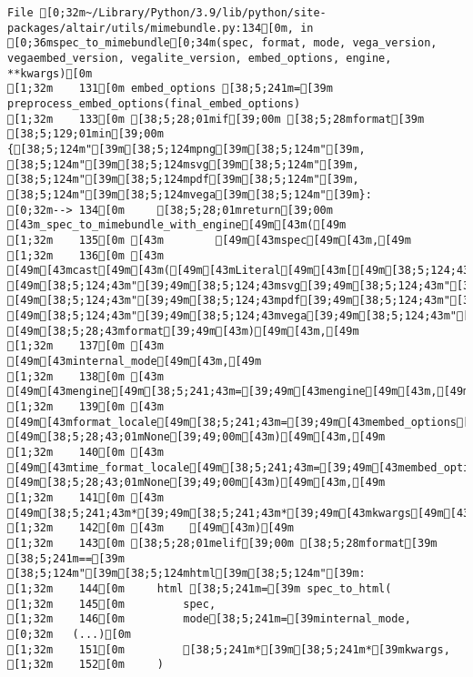 \documentclass[
  letterpaper,
  DIV=11,
  numbers=noendperiod]{scrartcl}
\begin{document}
\begin{verbatim}
File [0;32m~/Library/Python/3.9/lib/python/site-packages/altair/utils/mimebundle.py:134[0m, in [0;36mspec_to_mimebundle[0;34m(spec, format, mode, vega_version, vegaembed_version, vegalite_version, embed_options, engine, **kwargs)[0m
[1;32m    131[0m embed_options [38;5;241m=[39m preprocess_embed_options(final_embed_options)
[1;32m    133[0m [38;5;28;01mif[39;00m [38;5;28mformat[39m [38;5;129;01min[39;00m {[38;5;124m"[39m[38;5;124mpng[39m[38;5;124m"[39m, [38;5;124m"[39m[38;5;124msvg[39m[38;5;124m"[39m, [38;5;124m"[39m[38;5;124mpdf[39m[38;5;124m"[39m, [38;5;124m"[39m[38;5;124mvega[39m[38;5;124m"[39m}:
[0;32m--> 134[0m     [38;5;28;01mreturn[39;00m [43m_spec_to_mimebundle_with_engine[49m[43m([49m
[1;32m    135[0m [43m        [49m[43mspec[49m[43m,[49m
[1;32m    136[0m [43m        [49m[43mcast[49m[43m([49m[43mLiteral[49m[43m[[49m[38;5;124;43m"[39;49m[38;5;124;43mpng[39;49m[38;5;124;43m"[39;49m[43m,[49m[43m [49m[38;5;124;43m"[39;49m[38;5;124;43msvg[39;49m[38;5;124;43m"[39;49m[43m,[49m[43m [49m[38;5;124;43m"[39;49m[38;5;124;43mpdf[39;49m[38;5;124;43m"[39;49m[43m,[49m[43m [49m[38;5;124;43m"[39;49m[38;5;124;43mvega[39;49m[38;5;124;43m"[39;49m[43m][49m[43m,[49m[43m [49m[38;5;28;43mformat[39;49m[43m)[49m[43m,[49m
[1;32m    137[0m [43m        [49m[43minternal_mode[49m[43m,[49m
[1;32m    138[0m [43m        [49m[43mengine[49m[38;5;241;43m=[39;49m[43mengine[49m[43m,[49m
[1;32m    139[0m [43m        [49m[43mformat_locale[49m[38;5;241;43m=[39;49m[43membed_options[49m[38;5;241;43m.[39;49m[43mget[49m[43m([49m[38;5;124;43m"[39;49m[38;5;124;43mformatLocale[39;49m[38;5;124;43m"[39;49m[43m,[49m[43m [49m[38;5;28;43;01mNone[39;49;00m[43m)[49m[43m,[49m
[1;32m    140[0m [43m        [49m[43mtime_format_locale[49m[38;5;241;43m=[39;49m[43membed_options[49m[38;5;241;43m.[39;49m[43mget[49m[43m([49m[38;5;124;43m"[39;49m[38;5;124;43mtimeFormatLocale[39;49m[38;5;124;43m"[39;49m[43m,[49m[43m [49m[38;5;28;43;01mNone[39;49;00m[43m)[49m[43m,[49m
[1;32m    141[0m [43m        [49m[38;5;241;43m*[39;49m[38;5;241;43m*[39;49m[43mkwargs[49m[43m,[49m
[1;32m    142[0m [43m    [49m[43m)[49m
[1;32m    143[0m [38;5;28;01melif[39;00m [38;5;28mformat[39m [38;5;241m==[39m [38;5;124m"[39m[38;5;124mhtml[39m[38;5;124m"[39m:
[1;32m    144[0m     html [38;5;241m=[39m spec_to_html(
[1;32m    145[0m         spec,
[1;32m    146[0m         mode[38;5;241m=[39minternal_mode,
[0;32m   (...)[0m
[1;32m    151[0m         [38;5;241m*[39m[38;5;241m*[39mkwargs,
[1;32m    152[0m     )


\end{verbatim}
\end{document}

